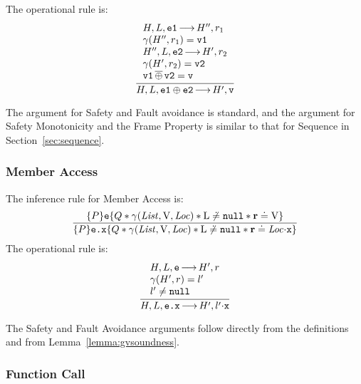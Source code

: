\documentclass{article}
\begin{document}
The operational rule is:
\[\frac{\begin{array}{l}
    H,L,\mbox{\texttt{{\upshape e1}}} {\,\longrightarrow\,} H'',r_1\\
    \gamma(H'',r_1) = \mbox{\texttt{{\upshape v1}}}\\
    H'',L,\mbox{\texttt{{\upshape e2}}} {\,\longrightarrow\,} H',r_2\\
    \gamma(H',r_2) = \mbox{\texttt{{\upshape v2}}}\\ 
    \mbox{\texttt{{\upshape v1}}}\,{\overline{\oplus}}\,\mbox{\texttt{{\upshape v2}}}=\mbox{\texttt{{\upshape v}}}
    \end{array}
}
{H,L, \mbox{\texttt{{\upshape e1}}} \oplus \mbox{\texttt{{\upshape e2}}} {\,\longrightarrow\,} H',\mbox{\texttt{{\upshape v}}}}
\]

The argument for Safety and Fault avoidance is standard, and the argument for Safety Monotonicity and the Frame Property is similar to that for Sequence in Section~\ref{sec:sequence}.

\subsubsection{Member Access}

The inference rule for Member Access is:
\[\frac
{\tr P {\js e} {Q\sep\getValue(\E{List},\LVAL,\E{Loc})\sep\V{L}\not\doteq\nil\sep\rv\doteq\LVAL}}
{\tr P {\js{e.x}} {Q\sep\getValue(\E{List},\LVAL,\E{Loc})\sep\V{L}\not\doteq\nil\sep\rv\doteq\E{Loc}\sv\js{x}}}
\]
The operational rule is:
\[\frac
{\begin{array}{l}H,L,\js{e} \levalsto H',\njs{r} \\
\getValue(H',\njs{r}) = l'\\
l'\neq \nil\end{array}}
{H,L,\js{e.x} \levalsto H',l'\sv\js{x}}
\]

The Safety and Fault Avoidance arguments follow directly from the definitions and from Lemma~\ref{lemma:gvsoundness}.

\subsubsection{Function Call}
\end{document}
